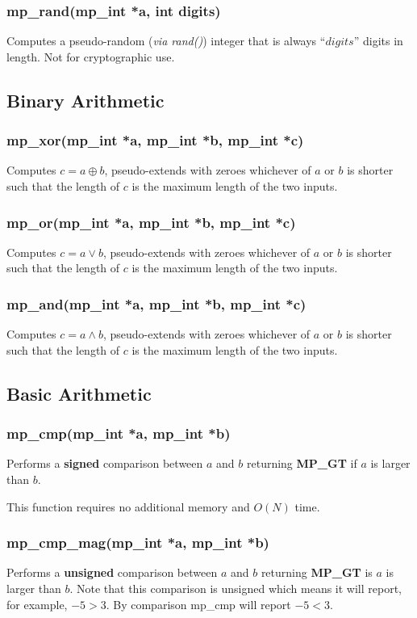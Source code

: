 \documentclass{article}
\begin{document}
\subsubsection{mp\_rand(mp\_int *a, int digits)}
Computes a pseudo-random (\textit{via rand()}) integer that is always ``$digits$'' digits in length.  Not for
cryptographic use.

\subsection{Binary Arithmetic}
\subsubsection{mp\_xor(mp\_int *a, mp\_int *b, mp\_int *c)}
Computes $c = a \oplus b$, pseudo-extends with zeroes whichever of $a$ or $b$ is shorter such that the length
of $c$ is the maximum length of the two inputs.

\subsubsection{mp\_or(mp\_int *a, mp\_int *b, mp\_int *c)}
Computes $c = a \lor b$, pseudo-extends with zeroes whichever of $a$ or $b$ is shorter such that the length
of $c$ is the maximum length of the two inputs.

\subsubsection{mp\_and(mp\_int *a, mp\_int *b, mp\_int *c)}
Computes $c = a \land b$, pseudo-extends with zeroes whichever of $a$ or $b$ is shorter such that the length
of $c$ is the maximum length of the two inputs.

\subsection{Basic Arithmetic}

\subsubsection{mp\_cmp(mp\_int *a, mp\_int *b)}
Performs a \textbf{signed} comparison between $a$ and $b$ returning \textbf{MP\_GT} if $a$ is larger than $b$.

This function requires no additional memory and $O(N)$ time.

\subsubsection{mp\_cmp\_mag(mp\_int *a, mp\_int *b)}
Performs a \textbf{unsigned} comparison between $a$ and $b$ returning \textbf{MP\_GT} is $a$ is larger than $b$.  Note 
that this comparison is unsigned which means it will report, for example, $-5 > 3$.  By comparison mp\_cmp will 
report $-5 < 3$.
\end{document}
